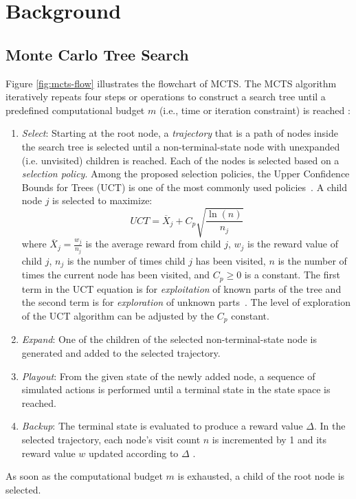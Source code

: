\documentclass[10pt, conference, compsocconf]{IEEEtran}
\begin{document}
\section{Background}
\label{sec:back}
\subsection{Monte Carlo Tree Search}
Figure \ref{fig:mcts-flow} illustrates the flowchart of MCTS. The MCTS algorithm iteratively repeats four steps or operations to construct a search tree until a predefined computational budget $m$ (i.e., time or iteration constraint) is reached : 
\begin{enumerate}
\item \textit{Select}: Starting at the root node, a \textit{trajectory} that is a path of nodes inside the search tree is selected until a non-terminal-state node with unexpanded (i.e. unvisited) children is reached. Each of the nodes is selected based on a \textit{selection policy}. Among the proposed selection policies, the Upper Confidence Bounds for Trees (UCT) is one of the most commonly used policies~\cite{Kocsis2006,Browne2012}. A child node $j$ is selected to maximize: 
\begin{equation}
UCT=\overline{X}_{j}+C_{p}\sqrt{\frac{\ln(n)}{n_{j}}}
\end{equation}
where $\overline{X}_{j}=\frac{w_{j}}{n_{j}} $ is the average reward from child $j$, $w_{j}$ is the reward value
of child $j$, $n_{j}$ is the number of times child $j$ has
been visited, $n$ is the number of times the current node has been
visited, and $C_{p}\geq0$ is a constant. The first term in the UCT
equation is for \textit{exploitation} of known parts of the tree and the second term is for
\textit{exploration} of unknown parts~\cite{Browne2012}. The level of exploration of the UCT
algorithm can be adjusted by the $C_{p}$ constant.



 
\item \textit{Expand}: One of the children of the selected non-terminal-state node is generated and added to the selected trajectory.
\item \textit{Playout}: From the given state of the newly added node, a sequence of simulated actions is performed until a terminal state in the state space is reached.
\item \textit{Backup}: The terminal state is evaluated to produce a reward value $\Delta$. In the selected trajectory, each node's visit count $n$ is incremented by 1 and its reward value $w$ updated according to $\Delta$ \cite{Browne2012}.
\end{enumerate}
As soon as the computational budget $m$ is exhausted, a child of the root node is selected.
\end{document}

